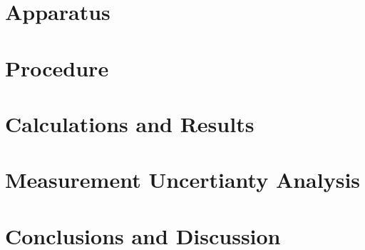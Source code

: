 \documentclass[12pt,a4paper]{article}
\begin{document}
\section{Apparatus}

\section{Procedure}

\section{Calculations and Results}

\section{Measurement Uncertianty Analysis}

\section{Conclusions and Discussion}

\end{document}
